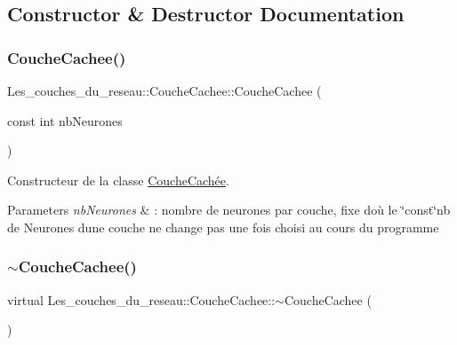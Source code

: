 \subsection{Constructor \& Destructor Documentation}
\mbox{\label{class_les__couches__du__reseau_1_1_couche_cachee_ae721a71bbab8bf2f9cc0f8ce581844da}} 
\subsubsection{\texorpdfstring{Couche\+Cachee()}{CoucheCachee()}}
{\footnotesize\ttfamily Les\+\_\+couches\+\_\+du\+\_\+reseau\+::\+Couche\+Cachee\+::\+Couche\+Cachee (\begin{DoxyParamCaption}\item[{const int}]{nb\+Neurones }\end{DoxyParamCaption})}



Constructeur de la classe \hyperlink{class_couche_cach_xC3_xA9e}{Couche\+Cachée}. 


\begin{DoxyParams}{Parameters}
{\em nb\+Neurones} & \+: nombre de neurones par couche, fixe d\textquotesingle{}où le \char`\"{}const\char`\"{}nb de Neurones d\textquotesingle{}une couche ne change pas une fois choisi au cours du programme \\
\hline
\end{DoxyParams}
\mbox{\label{class_les__couches__du__reseau_1_1_couche_cachee_a6277c5f276d60ed48d0a67768bab30d6}} 
\subsubsection{\texorpdfstring{$\sim$\+Couche\+Cachee()}{~CoucheCachee()}}
{\footnotesize\ttfamily virtual Les\+\_\+couches\+\_\+du\+\_\+reseau\+::\+Couche\+Cachee\+::$\sim$\+Couche\+Cachee (\begin{DoxyParamCaption}{ }\end{DoxyParamCaption})\hspace{0.3cm}{\ttfamily [virtual]}}



